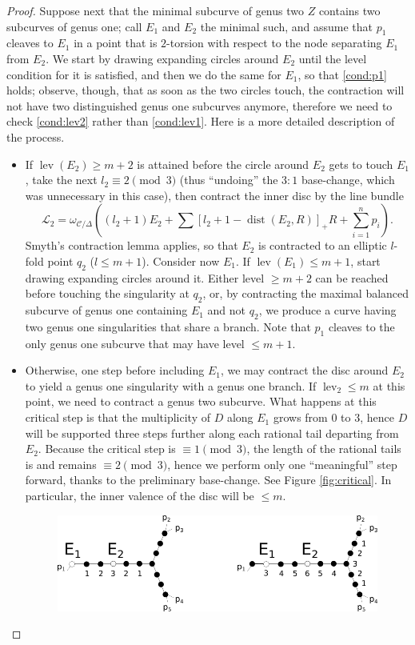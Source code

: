 \documentclass[11pt]{amsart}
\newcommand{\dvr}{\Delta}
\newcommand{\lev}{\operatorname{lev}}
\theoremstyle{plain}
\theoremstyle{definition}
\begin{document}
\begin{proof}
  Suppose next that the minimal subcurve of genus two $Z$ contains two subcurves of genus one; call $E_1$ and $E_2$ the minimal such, and assume that $p_1$ cleaves to $E_1$ in a point that is $2$-torsion with respect to the node separating $E_1$ from $E_2$. We start by drawing expanding circles around $E_2$ until the level condition for it is satisfied, and then we do the same for $E_1$, so that \eqref{cond:p1} holds; observe, though, that as soon as the two circles touch, the contraction will not have two distinguished genus one subcurves anymore, therefore we need to check \eqref{cond:lev2} rather than \eqref{cond:lev1}. Here is a more detailed description of the process.
  \begin{itemize}[leftmargin=.4cm]
  \item If $\lev(E_2)\geq m+2$ is attained before the circle around $E_2$ gets to touch $E_1$, take the next $l_2\equiv 2  \pmod 3$ (thus ``undoing'' the $3:1$ base-change, which was unnecessary in this case), then contract the inner disc by the line bundle \[\mathcal L_2=\omega_{\mathcal C/\dvr}((l_2+1)E_2+\sum [l_2+1-\operatorname{dist}(E_2,R)]_+R+\sum_{i=1}^n p_i).\] Smyth's contraction lemma \cite[Lemma 2.13]{SMY1} applies, so that $E_2$ is contracted to an elliptic $l$-fold point $q_2$ ($l\leq m+1$). Consider now $E_1$. If $\lev(E_1)\leq m+1$, start drawing expanding circles around it. Either level $\geq m+2$ can be reached before touching the singularity at $q_2$, or, by contracting the maximal balanced subcurve of genus one containing $E_1$ and not $q_2$, we produce a curve having two genus one singularities that share a branch. Note that $p_1$ cleaves to the only genus one subcurve that may have level $\leq m+1$.
  \item Otherwise, one step before including $E_1$, we may contract the disc around $E_2$ to yield a genus one singularity with a genus one branch. If $\lev_2\leq m$ at this point, we need to contract a genus two subcurve. What happens at this critical step is that the multiplicity of $D$ along $E_1$ grows from $0$ to $3$, hence $D$ will be supported three steps further along each rational tail departing from $E_2$. Because the critical step is $\equiv 1\pmod 3$, the length of the rational tails is and remains $\equiv 2 \pmod 3$, hence we perform only one ``meaningful'' step forward, thanks to the preliminary base-change. See Figure \ref{fig:critical}. In particular, the inner valence of the disc will be $\leq m$.
  \begin{figure}
   \includegraphics[width=.8\textwidth]{critical_step}

\end{figure}
\end{itemize}
\end{proof}
\end{document}
